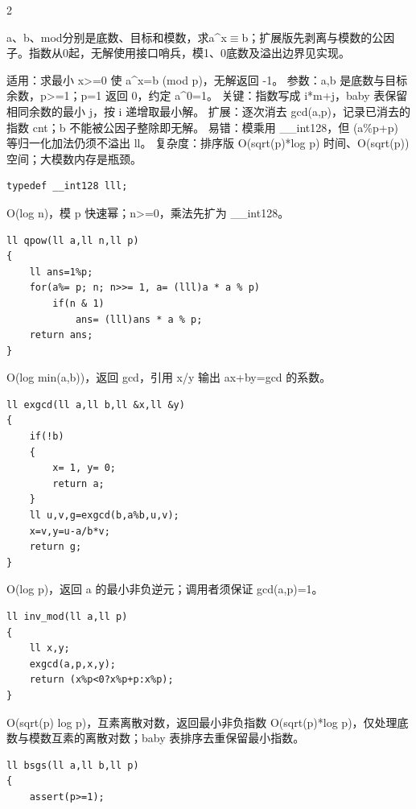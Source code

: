 \documentclass[UTF8,fontset=fandol,a4paper,twoside]{ctexart}
\newcommand{\note}[1]{{\fontsize{10}{12}\selectfont #1\par}}
\begin{document}
\begin{multicols}{2}
\note{a、b、mod分别是底数、目标和模数，求a\textasciicircum{}x\ensuremath{\equiv}b；扩展版先剥离与模数的公因子。指数从0起，无解使用接口哨兵，模1、0底数及溢出边界见实现。}
\note{适用：求最小 x>\allowbreak{}=\allowbreak{}0 使 a\textasciicircum{}x=\allowbreak{}b (\allowbreak{}mod p)\allowbreak{}，无解返回 -\allowbreak{}1。 参数：a,\allowbreak{}b 是底数与目标余数，p>\allowbreak{}=\allowbreak{}1；p=\allowbreak{}1 返回 0，约定 a\textasciicircum{}0=\allowbreak{}1。 关键：指数写成 i*m+\allowbreak{}j，baby 表保留相同余数的最小 j，按 i 递增取最小解。 扩展：逐次消去 gcd(\allowbreak{}a,\allowbreak{}p)\allowbreak{}，记录已消去的指数 cnt；b 不能被公因子整除即无解。 易错：模乘用 \_\_int128，但 (\allowbreak{}a\%p+\allowbreak{}p)\allowbreak{} 等归一化加法仍须不溢出 ll。 复杂度：排序版 O(\allowbreak{}sqrt(\allowbreak{}p)\allowbreak{}*log p)\allowbreak{} 时间、O(\allowbreak{}sqrt(\allowbreak{}p)\allowbreak{})\allowbreak{} 空间；大模数内存是瓶颈。}
\begin{lstlisting}
typedef __int128 lll;
\end{lstlisting}
\note{O(\allowbreak{}log n)\allowbreak{}，模 p 快速幂；n>\allowbreak{}=\allowbreak{}0，乘法先扩为 \_\_int128。}
\begin{lstlisting}
ll qpow(ll a,ll n,ll p)
{
    ll ans=1%p;
    for(a%= p; n; n>>= 1, a= (lll)a * a % p)
        if(n & 1)
            ans= (lll)ans * a % p;
    return ans;
}
\end{lstlisting}
\note{O(\allowbreak{}log min(\allowbreak{}a,\allowbreak{}b)\allowbreak{})\allowbreak{}，返回 gcd，引用 x/\allowbreak{}y 输出 ax+\allowbreak{}by=\allowbreak{}gcd 的系数。}
\begin{lstlisting}
ll exgcd(ll a,ll b,ll &x,ll &y)
{
    if(!b)
    {
        x= 1, y= 0;
        return a;
    }
    ll u,v,g=exgcd(b,a%b,u,v);
    x=v,y=u-a/b*v;
    return g;
}
\end{lstlisting}
\note{O(\allowbreak{}log p)\allowbreak{}，返回 a 的最小非负逆元；调用者须保证 gcd(\allowbreak{}a,\allowbreak{}p)\allowbreak{}=\allowbreak{}1。}
\begin{lstlisting}
ll inv_mod(ll a,ll p)
{
    ll x,y;
    exgcd(a,p,x,y);
    return (x%p<0?x%p+p:x%p);
}
\end{lstlisting}
\note{O(\allowbreak{}sqrt(\allowbreak{}p)\allowbreak{} log p)\allowbreak{}，互素离散对数，返回最小非负指数 O(\allowbreak{}sqrt(\allowbreak{}p)\allowbreak{}*log p)\allowbreak{}，仅处理底数与模数互素的离散对数；baby 表排序去重保留最小指数。}
\begin{lstlisting}
ll bsgs(ll a,ll b,ll p)
{
    assert(p>=1);

\end{lstlisting}
\end{multicols}
\end{document}
